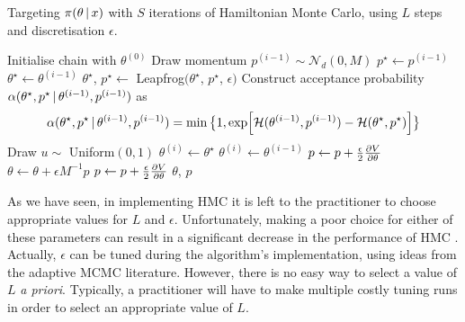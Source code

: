 \begin{algorithm}[tb]
  \caption{Targeting $\pi(\theta \,|\, x)$ with $S$ iterations of Hamiltonian Monte
  Carlo, using $L$ steps and discretisation $\epsilon$.}
  \label{alg:hmc}
  \begin{algorithmic}[1]
    \State Initialise chain with $\theta^{(0)}$
      \State Draw momentum $p^{(i-1)} \sim \mathcal{N}_d(0, M)$
      \State $p^\star \leftarrow p^{(i-1)}$
      \State $\theta^\star \leftarrow\theta^{(i-1)}$
      \State {}
        \State $\theta^\star$, $p^\star \leftarrow$ Leapfrog$(\theta^\star$,
                                                             $p^\star$, $\epsilon)$
      \EndFor
      \State Construct acceptance probability $\alpha(\theta^\star, p^\star \,|\,
                                               \theta^{(i-1)}, p^{(i-1)})$ as
        \begin{equation*}
            \alpha(\theta^\star, p^\star \,|\,\theta^{(i-1)}, p^{(i-1)}) =
            \min\big\{1, \exp[\mathcal{H}(\theta^{(i-1)}, p^{(i-1)}) -
                              \mathcal{H}(\theta^\star, p^\star)]
                  \big\}
        \end{equation*}
      \State Draw $u \sim$ Uniform$(0, 1)$
        \State {}
        \State $\theta^{(i)} \leftarrow\theta^\star$
      \Else
        \State {}
        \State $\theta^{(i)} \leftarrow\theta^{(i-1)}$
      \EndIf
    \EndFor
  \State
    \State $p \leftarrow p + \frac{\epsilon}{2} \pdv{V}{\theta}$
    \State $\theta \leftarrow \theta + \epsilon M^{-1} p$
    \State $p \leftarrow p + \frac{\epsilon}{2} \pdv{V}{\theta}$
    \State \Return $\theta$, $p$
  \EndProcedure
  \end{algorithmic}
\end{algorithm}

As we have seen, in implementing HMC it is left to the practitioner to choose appropriate
values for $L$ and $\epsilon$. Unfortunately, making a poor choice for either of these
parameters can result in a significant decrease in the performance of HMC
\parencite{hoffman14}. Actually, $\epsilon$ can be tuned during the algorithm's
implementation, using ideas from the adaptive MCMC literature. However, there is no easy
way to select a value of $L$ \emph{a priori}. Typically, a practitioner will have to make
multiple costly tuning runs in order to select an appropriate value of $L$.

